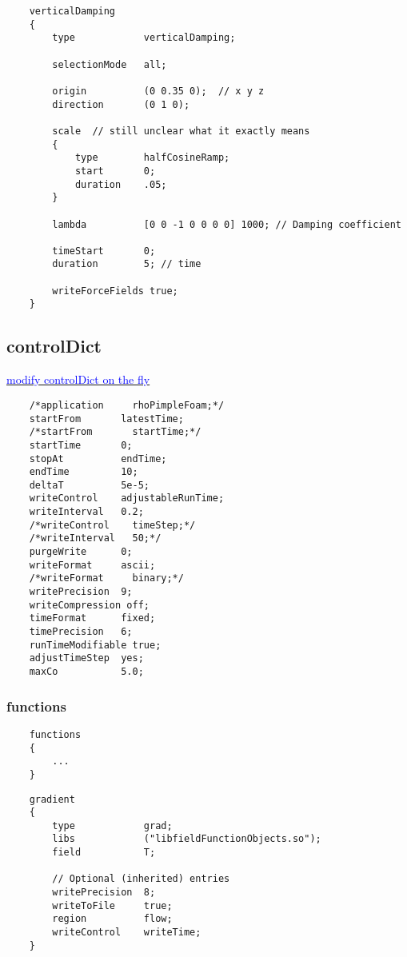 \documentclass[a4paper, 12pt]{article}
\numberwithin{equation}{section}
\newcommand{\blue}[1]{\textcolor{blue}{#1}}
\begin{document}
    {
    \begin{verbatim}
    verticalDamping
    {
        type            verticalDamping;

        selectionMode   all;

        origin          (0 0.35 0);  // x y z
        direction       (0 1 0);

        scale  // still unclear what it exactly means
        {
            type        halfCosineRamp;
            start       0;
            duration    .05;
        }

        lambda          [0 0 -1 0 0 0 0] 1000; // Damping coefficient

        timeStart       0;
        duration        5; // time

        writeForceFields true;
    }
    \end{verbatim}
    }



    \subsection{controlDict}

    \href{https://www.cfd-online.com/Forums/openfoam-solving/128713-varying-time-step.html}{\blue{modify controlDict on the fly}}

    {
    \begin{verbatim}
    /*application     rhoPimpleFoam;*/
    startFrom       latestTime;
    /*startFrom       startTime;*/
    startTime       0;
    stopAt          endTime;
    endTime         10;
    deltaT          5e-5;
    writeControl    adjustableRunTime;
    writeInterval   0.2;
    /*writeControl    timeStep;*/
    /*writeInterval   50;*/
    purgeWrite      0;
    writeFormat     ascii;
    /*writeFormat     binary;*/
    writePrecision  9;
    writeCompression off;
    timeFormat      fixed;
    timePrecision   6;
    runTimeModifiable true;
    adjustTimeStep  yes;
    maxCo           5.0;
    \end{verbatim}
    }

        \subsubsection{functions}
    {
    \begin{verbatim}
    functions
    {
        ...
    }
    \end{verbatim}
    }

    \begin{minipage}{\textwidth}
    {
    \begin{verbatim}
    gradient
    {
        type            grad;
        libs            ("libfieldFunctionObjects.so");
        field           T;

        // Optional (inherited) entries
        writePrecision  8;
        writeToFile     true;
        region          flow;
        writeControl    writeTime;
    }
    \end{verbatim}
    }
    \end{minipage}
\end{document}
